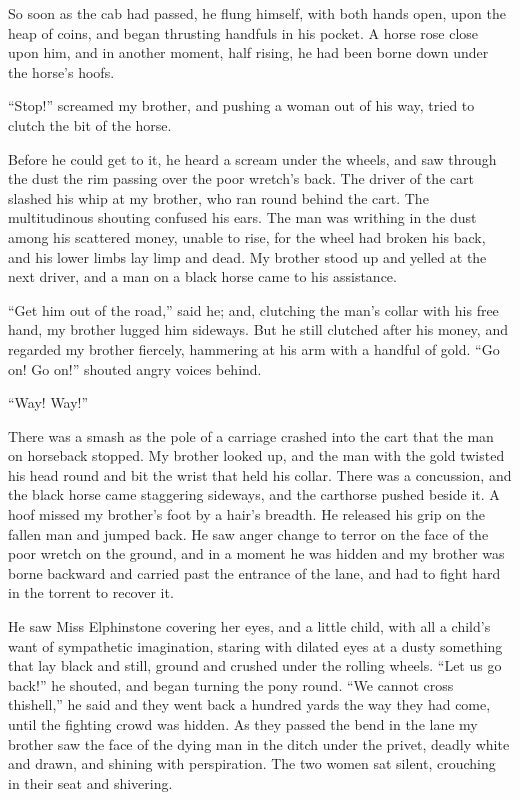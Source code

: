 So soon as the cab had passed, he flung himself, with both hands
open, upon the heap of coins, and began thrusting handfuls in his
pocket. A horse rose close upon him, and in another moment, half
rising, he had been borne down under the horse's hoofs.

``Stop!'' screamed my brother, and pushing a woman out of his way,
tried to clutch the bit of the horse.

Before he could get to it, he heard a scream under the wheels, and
saw through the dust the rim passing over the poor wretch's back.
The driver of the cart slashed his whip at my brother, who ran
round behind the cart. The multitudinous shouting confused his
ears. The man was writhing in the dust among his scattered money,
unable to rise, for the wheel had broken his back, and his lower
limbs lay limp and dead. My brother stood up and yelled at the next
driver, and a man on a black horse came to his assistance.

``Get him out of the road,'' said he; and, clutching the man's collar
with his free hand, my brother lugged him sideways. But he still
clutched after his money, and regarded my brother fiercely,
hammering at his arm with a handful of gold. ``Go on! Go on!''
shouted angry voices behind.

``Way! Way!''

There was a smash as the pole of a carriage crashed into the cart
that the man on horseback stopped. My brother looked up, and the
man with the gold twisted his head round and bit the wrist that
held his collar. There was a concussion, and the black horse came
staggering sideways, and the carthorse pushed beside it. A hoof
missed my brother's foot by a hair's breadth. He released his grip
on the fallen man and jumped back. He saw anger change to terror on
the face of the poor wretch on the ground, and in a moment he was
hidden and my brother was borne backward and carried past the
entrance of the lane, and had to fight hard in the torrent to
recover it.

He saw Miss Elphinstone covering her eyes, and a little child, with
all a child's want of sympathetic imagination, staring with dilated
eyes at a dusty something that lay black and still, ground and
crushed under the rolling wheels. ``Let us go back!'' he shouted, and
began turning the pony round. ``We cannot cross this\dash{}hell,'' he said
and they went back a hundred yards the way they had come, until the
fighting crowd was hidden. As they passed the bend in the lane my
brother saw the face of the dying man in the ditch under the
privet, deadly white and drawn, and shining with perspiration. The
two women sat silent, crouching in their seat and shivering.

